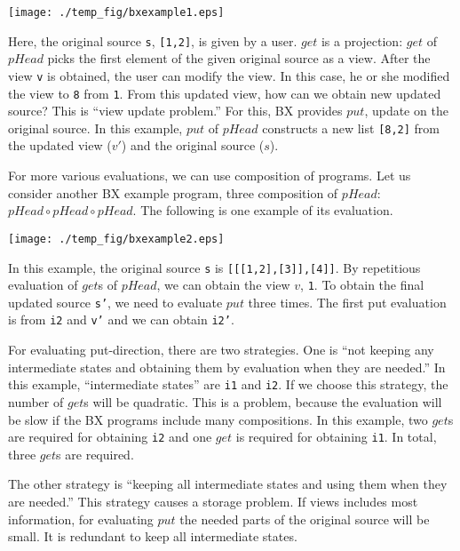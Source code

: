 \begin{center}
  \texttt{[image: ./temp\_fig/bxexample1.eps]}
\end{center}

Here, the original source \texttt{s}, \texttt{[1,2]}, is given by a user. $get$ is a projection: $get$ of $pHead$ picks the first element of the given original source as a view.
After the view \texttt{v} is obtained, the user can modify the view.
In this case, he or she modified the view to \texttt{8} from \texttt{1}.
From this updated view, how can we obtain new updated source? This is ``view update problem.'' For this, BX provides $put$, update on the original source.
In this example, $put$ of $pHead$ constructs a new list \texttt{[8,2]} from the updated view ($v'$) and the original source ($s$).

For more various evaluations, we can use composition of programs.
Let us consider another BX example program, three composition of $pHead$: $pHead \circ pHead \circ pHead$.
The following is one example of its evaluation.


\begin{center}
  \texttt{[image: ./temp\_fig/bxexample2.eps]}
\end{center}

In this example, the original source \texttt{s} is \texttt{[[[1,2],[3]],[4]]}.
By repetitious evaluation of $get$s of $pHead$, we can obtain the view $v$, \texttt{1}. To obtain the final updated source \texttt{s'}, we need to evaluate $put$ three times. The first put evaluation is from \texttt{i2} and \texttt{v'} and we can obtain \texttt{i2'}.

For evaluating put-direction, there are two strategies. One is ``not keeping any intermediate states and obtaining them by evaluation when they are needed.'' In this example, ``intermediate states'' are \texttt{i1} and \texttt{i2}.
If we choose this strategy, the number of $get$s will be quadratic. This is a problem, because the evaluation will be slow if the BX programs include many compositions. In this example, two $get$s are required for obtaining \texttt{i2} and one $get$ is required for obtaining \texttt{i1}. In total, three $get$s are required.

The other strategy is ``keeping all intermediate states and using them when they are needed.'' This strategy causes a storage problem. If views includes most information, for evaluating $put$ the needed parts of the original source will be small. It is redundant to keep all intermediate states.

